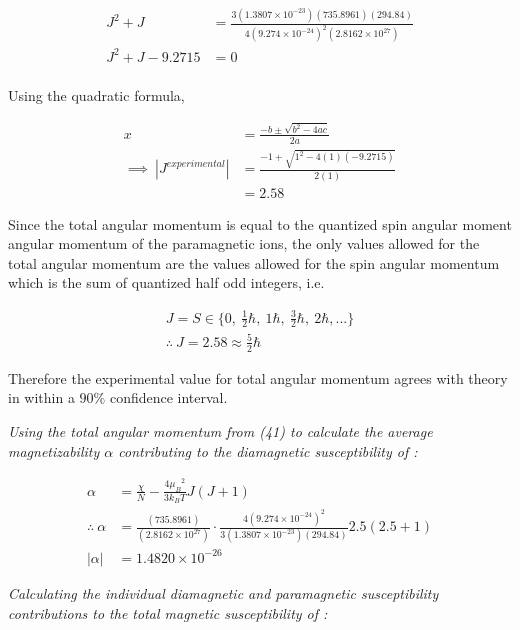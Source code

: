 \documentclass[a4paper,11pt]{article}
\begin{document}
\begin{align}
J^2 + J	& = \frac{3 (1.3807 \times 10^{-23}) (735.8961) (294.84)}{4 (9.274 \times 10^{-24})^2 (2.8162 \times 10^{27})}\nonumber\\
J^2 + J - 9.2715	& = 0\nonumber\\
\end{align}

Using the quadratic formula,

\begin{align}
x	& = \frac{-b \pm \sqrt{b^2-4ac}}{2a}\nonumber\\
\implies~|J^{\textit{experimental}}|	& = \frac{-1 + \sqrt{1^2-4(1)(-9.2715)}}{2(1)}\nonumber\\
				& = 2.58
\end{align}

Since the total angular momentum is equal to the quantized spin angular moment angular momentum of the paramagnetic ions, the only values allowed for the total angular momentum are the values allowed for the spin angular momentum which is the sum of quantized half odd integers, i.e.

\begin{align}
J = S \in \{0,~\frac{1}{2}\hbar,~1\hbar,~\frac{3}{2}\hbar,~2\hbar, ...\}\nonumber\\
\therefore~J = 2.58 \approx \frac{5}{2}\hbar
\end{align}

Therefore the experimental value for total angular momentum agrees with theory in within a $90\%$ confidence interval.

\begin{center}
\textit{Using the total angular momentum from (41) to calculate the average magnetizability $\alpha$ contributing to the diamagnetic susceptibility of :}
\end{center}

\begin{align}
\alpha	& = \frac{\chi}{N} - \frac{4 {\mu_B}^2}{3 k_B T} J(J+1)\nonumber\\
\therefore~\alpha	& = \frac{(735.8961)}{(2.8162\times10^{27})} \cdot \frac{4 (9.274 \times 10^{-24})^2}{3 (1.3807 \times 10^{-23}) (294.84)} 2.5(2.5+1)\nonumber\\
|\alpha|	& = 1.4820 \times 10^{-26} 
\end{align}

\clearpage

\begin{center}
\textit{Calculating the individual diamagnetic and paramagnetic susceptibility contributions to the total magnetic susceptibility of :}
\end{center}
\end{document}
